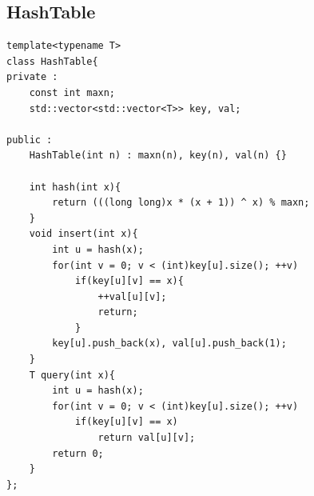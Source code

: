 \documentclass[twoside]{article}
\begin{document}
\subsection{HashTable}
\begin{lstlisting}
template<typename T>
class HashTable{
private :
    const int maxn;
    std::vector<std::vector<T>> key, val;

public :
    HashTable(int n) : maxn(n), key(n), val(n) {}

    int hash(int x){
        return (((long long)x * (x + 1)) ^ x) % maxn;
    }
    void insert(int x){
        int u = hash(x);
        for(int v = 0; v < (int)key[u].size(); ++v)
            if(key[u][v] == x){
                ++val[u][v];
                return;
            }
        key[u].push_back(x), val[u].push_back(1);
    }
    T query(int x){
        int u = hash(x);
        for(int v = 0; v < (int)key[u].size(); ++v)
            if(key[u][v] == x)
                return val[u][v];
        return 0;
    }
};\end{lstlisting}
\end{document}

